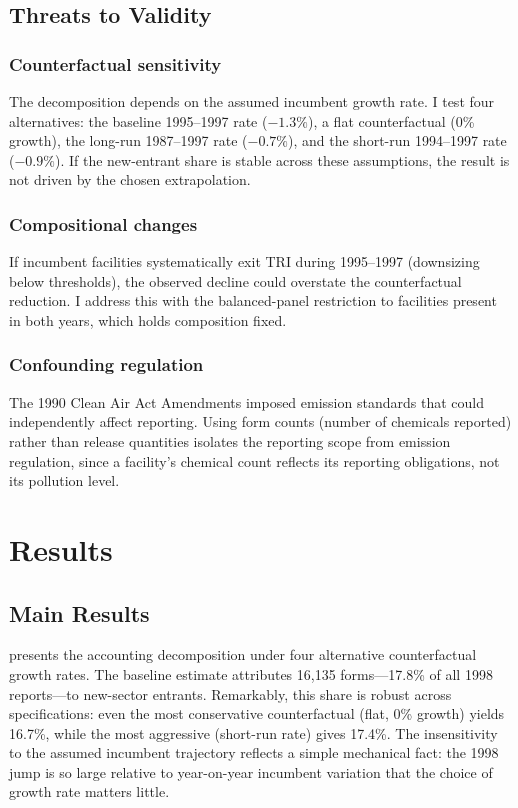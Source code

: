 \documentclass[12pt]{article}
\begin{document}
\subsection{Threats to Validity}

\subsubsection*{Counterfactual sensitivity} The decomposition depends on the assumed incumbent growth rate. I test four alternatives: the baseline 1995--1997 rate ($-1.3\%$), a flat counterfactual (0\% growth), the long-run 1987--1997 rate ($-0.7\%$), and the short-run 1994--1997 rate ($-0.9\%$). If the new-entrant share is stable across these assumptions, the result is not driven by the chosen extrapolation.

\subsubsection*{Compositional changes} If incumbent facilities systematically exit TRI during 1995--1997 (downsizing below thresholds), the observed decline could overstate the counterfactual reduction. I address this with the balanced-panel restriction to facilities present in both years, which holds composition fixed.

\subsubsection*{Confounding regulation} The 1990 Clean Air Act Amendments imposed emission standards that could independently affect reporting. Using form counts (number of chemicals reported) rather than release quantities isolates the reporting scope from emission regulation, since a facility's chemical count reflects its reporting obligations, not its pollution level.

\section{Results}

\subsection{Main Results}



 presents the accounting decomposition under four alternative counterfactual growth rates. The baseline estimate attributes 16,135 forms---17.8\% of all 1998 reports---to new-sector entrants. Remarkably, this share is robust across specifications: even the most conservative counterfactual (flat, 0\% growth) yields 16.7\%, while the most aggressive (short-run rate) gives 17.4\%. The insensitivity to the assumed incumbent trajectory reflects a simple mechanical fact: the 1998 jump is so large relative to year-on-year incumbent variation that the choice of growth rate matters little.
\end{document}

